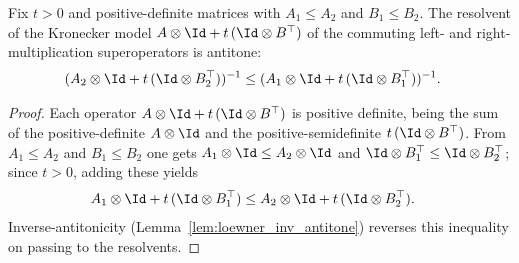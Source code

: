\begin{lemma}
    \label{lem:superop_resolvent_antitone}
    \leanok
    Fix $t>0$ and positive-definite matrices with $A_1\le A_2$ and
    $B_1\le B_2$. The resolvent of the Kronecker model
    $A\otimes\Id+t\,(\Id\otimes B^\top)$ of the commuting left- and
    right-multiplication superoperators is antitone:
    \begin{align}
        (A_2\otimes\Id+t\,(\Id\otimes B_2^\top))^{-1}
        &\le
        (A_1\otimes\Id+t\,(\Id\otimes B_1^\top))^{-1}.
        \notag
    \end{align}
\end{lemma}

\begin{proof}\leanok
    Each operator $A\otimes\Id+t\,(\Id\otimes B^\top)$ is positive definite,
    being the sum of the positive-definite $A\otimes\Id$ and the
    positive-semidefinite $t\,(\Id\otimes B^\top)$. From $A_1\le A_2$ and
    $B_1\le B_2$ one gets $A_1\otimes\Id\le A_2\otimes\Id$ and
    $\Id\otimes B_1^\top\le\Id\otimes B_2^\top$; since $t>0$, adding these
    yields
    \begin{align}
        A_1\otimes\Id+t\,(\Id\otimes B_1^\top)
        &\le
        A_2\otimes\Id+t\,(\Id\otimes B_2^\top).
        \notag
    \end{align}
    Inverse-antitonicity (Lemma~\ref{lem:loewner_inv_antitone}) reverses this
    inequality on passing to the resolvents.
\end{proof}
